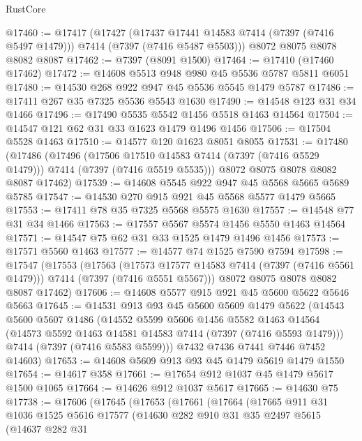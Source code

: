 \begin{lexlean}{RustCore}
\begin{coremodule}
@17460 := @17417
    (@17427
      (@17437 @17441 @14583 @7414 (@7397 (@7416 @5497 @1479)))
      @7414
      (@7397 (@7416 @5487 @5503)))
    @8072
    @8075
    @8078
    @8082
    @8087
@17462 := @7397 (@8091 @1500)
@17464 := @17410 (@17460 @17462)
@17472 := @14608 @5513 @948 @980 @45 @5536 @5787 @5811 @6051
@17480 := @14530 @268 @922 @947 @45 @5536 @5545 @1479 @5787
@17486 := @17411 @267 @35 @7325 @5536 @5543 @1630
@17490 := @14548 @123 @31 @34 @1466
@17496 := @17490 @5535 @5542 @1456 @5518 @1463 @14564
@17504 := @14547 @121 @62 @31 @33 @1623 @1479 @1496 @1456
@17506 := @17504 @5528 @1463
@17510 := @14577 @120 @1623 @8051 @8055
@17531 := @17480
    (@17486
      (@17496
        (@17506 @17510 @14583 @7414 (@7397 (@7416 @5529 @1479)))
        @7414
        (@7397 (@7416 @5519 @5535)))
      @8072
      @8075
      @8078
      @8082
      @8087
      @17462)
@17539 := @14608 @5545 @922 @947 @45 @5568 @5665 @5689 @5785
@17547 := @14530 @270 @915 @921 @45 @5568 @5577 @1479 @5665
@17553 := @17411 @78 @35 @7325 @5568 @5575 @1630
@17557 := @14548 @77 @31 @34 @1466
@17563 := @17557 @5567 @5574 @1456 @5550 @1463 @14564
@17571 := @14547 @75 @62 @31 @33 @1525 @1479 @1496 @1456
@17573 := @17571 @5560 @1463
@17577 := @14577 @74 @1525 @7590 @7594
@17598 := @17547
    (@17553
      (@17563
        (@17573 @17577 @14583 @7414 (@7397 (@7416 @5561 @1479)))
        @7414
        (@7397 (@7416 @5551 @5567)))
      @8072
      @8075
      @8078
      @8082
      @8087
      @17462)
@17606 := @14608 @5577 @915 @921 @45 @5600 @5622 @5646 @5663
@17645 := @14531
    @913
    @93
    @45
    @5600
    @5609
    @1479
    @5622
    (@14543
      @5600
      @5607
      @1486
      (@14552
        @5599
        @5606
        @1456
        @5582
        @1463
        @14564
        (@14573 @5592 @1463 @14581 @14583 @7414 (@7397 (@7416 @5593 @1479)))
        @7414
        (@7397 (@7416 @5583 @5599)))
      @7432
      @7436
      @7441
      @7446
      @7452
      @14603)
@17653 := @14608 @5609 @913 @93 @45 @1479 @5619 @1479 @1550
@17654 := @14617 @358
@17661 := @17654 @912 @1037 @45 @1479 @5617 @1500 @1065
@17664 := @14626 @912 @1037 @5617
@17665 := @14630 @75
@17738 := @17606
    (@17645
      (@17653
        (@17661
          (@17664
            (@17665
              @911
              @31
              @1036
              @1525
              @5616
              @17577
              (@14630
                @282
                @910
                @31
                @35
                @2497
                @5615
                (@14637
                  @282
                  @31

\end{coremodule}
\end{lexlean}
